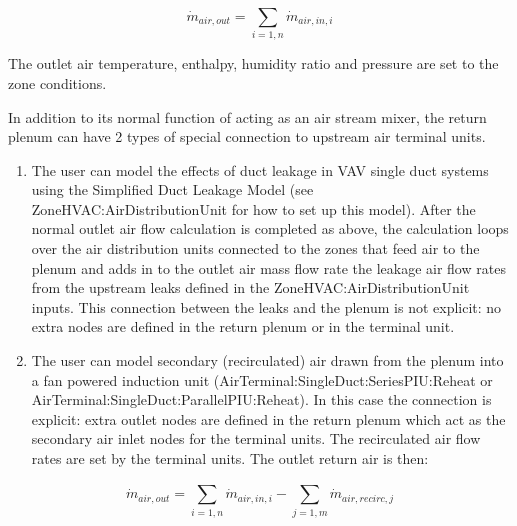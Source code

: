 \begin{equation}
{\dot m_{air,out}} = \sum\limits_{i = 1,n} {{{\dot m}_{air,in,i}}}
\end{equation}

The outlet air temperature, enthalpy, humidity ratio and pressure are set to the zone conditions.

In addition to its normal function of acting as an air stream mixer, the return plenum can have 2 types of special connection to upstream air terminal units.

\begin{enumerate}
\def\labelenumi{(\arabic{enumi})}
\item
  The user can model the effects of duct leakage in VAV single duct systems using the Simplified Duct Leakage Model (see ZoneHVAC:AirDistributionUnit for how to set up this model). After the normal outlet air flow calculation is completed as above, the calculation loops over the air distribution units connected to the zones that feed air to the plenum and adds in to the outlet air mass flow rate the leakage air flow rates from the upstream leaks defined in the ZoneHVAC:AirDistributionUnit inputs. This connection between the leaks and the plenum is not explicit: no extra nodes are defined in the return plenum or in the terminal unit.
\item
  The user can model secondary (recirculated) air drawn from the plenum into a fan powered induction unit (AirTerminal:SingleDuct:SeriesPIU:Reheat or AirTerminal:SingleDuct:ParallelPIU:Reheat). In this case the connection is explicit: extra outlet nodes are defined in the return plenum which act as the secondary air inlet nodes for the terminal units. The recirculated air flow rates are set by the terminal units. The outlet return air is then:
\end{enumerate}

\begin{equation}
{\dot m_{air,out}} = \sum\limits_{i = 1,n} {{{\dot m}_{air,in,i}}}  - \sum\limits_{j = 1,m}^{} {{{\dot m}_{air,recirc,j}}}
\end{equation}
